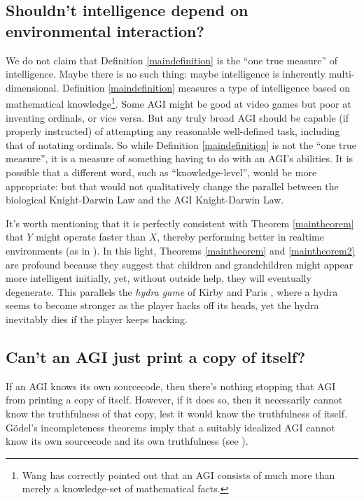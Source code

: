 \documentclass[runningheads]{llncs}
\begin{document}
\subsection{Shouldn't intelligence depend on environmental interaction?}

We do not claim that Definition \ref{maindefinition} is the ``one true measure'' of
intelligence. Maybe there is no such thing: maybe intelligence is inherently
multi-dimensional. Definition \ref{maindefinition} measures a type of
intelligence based on mathematical knowledge\footnote{Wang has
correctly pointed out \cite{wang2007} that an AGI consists of much more than merely
a knowledge-set of mathematical facts.}. Some AGI might be good at video games
but poor at inventing ordinals,
or vice versa. But any truly broad AGI should be capable (if properly
instructed) of attempting any reasonable well-defined task, including that of
notating ordinals.
So while Definition \ref{maindefinition} is not the ``one true measure'', it is a
measure of something having to do with an AGI's abilities. It is possible that
a different word, such as
``knowledge-level'', would be more appropriate: but
that would not qualitatively change
the parallel between the biological Knight-Darwin Law and the
AGI Knight-Darwin Law.

It's worth mentioning that it is perfectly consistent with
Theorem \ref{maintheorem} that $Y$ might operate faster
than $X$, thereby performing better in realtime environments (as in \cite{gavane}).
In this light, Theorems \ref{maintheorem} and \ref{maintheorem2} are profound because
they suggest that children and grandchildren might appear more intelligent
initially, yet, without outside help, they will eventually degenerate.
This parallels the \emph{hydra game} of
Kirby and Paris \cite{kirby1982accessible}, where a hydra
seems to become stronger as the player hacks off its heads, yet
the hydra inevitably dies if the player keeps hacking.

\subsection{Can't an AGI just print a copy of itself?}

If an AGI knows its own sourcecode, then there's nothing stopping that
AGI from printing a copy of itself.
However, if it does so, then it necessarily cannot know the truthfulness of that
copy, lest it would know the truthfulness of itself.
G\"odel's incompleteness theorems imply that a suitably idealized AGI cannot know
its own sourcecode
and its own truthfulness (see \cite{alexander2014machine}).
\end{document}
